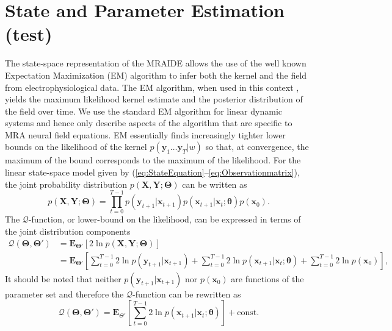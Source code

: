 \documentclass[11pt,draftcls,onecolumn,peerreview]{IEEEtran}
\begin{document}
\section{State and Parameter Estimation (test)}
The state-space representation of the MRAIDE allows the use of the well known Expectation Maximization (EM) algorithm \cite{Dempster1977} to infer both the kernel and the field from electrophysiological data. The EM algorithm, when used in this context \cite{Dewar2009}, yields the maximum likelihood kernel estimate and the posterior distribution of the field over time. We use the standard EM algorithm for linear dynamic systems \cite{Shumway2000} and hence only describe aspects of the algorithm that are specific to MRA neural field equations. EM essentially finds increasingly tighter lower bounds on the likelihood of the kernel $p(\mathbf{y}_1 \ldots \mathbf{y}_T|w)$ so that, at convergence, the maximum of the bound corresponds to the maximum of the likelihood. 
For the linear state-space model given by (\ref{eq:StateEquation}--\ref{eq:Observationmatrix}), the joint probability distribution $p(\mathbf X,\mathbf Y;\boldsymbol \Theta)$ can be written as
 \begin{equation}\label{eq:jointdistribution}
  p(\mathbf X,\mathbf Y;\boldsymbol \Theta)=\prod_{t=0}^{T-1} p(\mathbf y_{t+1}|\mathbf x_{t+1})p(\mathbf x_{t+1}|\mathbf x_{t};\boldsymbol \theta)p(\mathbf x_0).
 \end{equation}
 The $\mathcal Q$-function, or lower-bound on the likelihood, can be expressed in terms of the joint distribution components
 \begin{align}
  \mathcal Q(\boldsymbol \Theta,\boldsymbol\Theta')&=\mathbf E_{\boldsymbol \Theta'}\left[2\ln p(\mathbf X,\mathbf Y;\boldsymbol \Theta)\right] \nonumber \\
 &=\mathbf E_{\boldsymbol\Theta'}\left[\sum_{t=0}^{T-1}2\ln p(\mathbf y_{t+1}|\mathbf x_{t+1})+\sum_{t=0}^{T-1}2\ln p(\mathbf x_{t+1}|\mathbf x_{t};\boldsymbol \theta)
 +\sum_{t=0}^{T-1}2\ln p(\mathbf x_0)\right],
 \end{align}
It should be noted that neither $p(\mathbf y_{t+1}|\mathbf x_{t+1})$ nor $p(\mathbf x_0)$ are functions of the parameter set and therefore the $\mathcal Q$-function can be rewritten as
\begin{equation}
\mathcal Q(\boldsymbol \Theta,\boldsymbol\Theta')=\mathbf E_{\Theta'}\left[\sum_{t=0}^{T-1}2\ln p(\mathbf x_{t+1}|\mathbf x_{t};\boldsymbol \theta)\right]+\mathrm{const.}
\end{equation}
\end{document}
